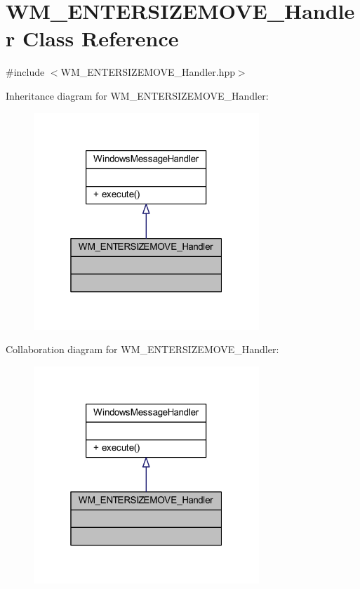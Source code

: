 \hypertarget{class_w_m___e_n_t_e_r_s_i_z_e_m_o_v_e___handler}{}\section{W\+M\+\_\+\+E\+N\+T\+E\+R\+S\+I\+Z\+E\+M\+O\+V\+E\+\_\+\+Handler Class Reference}
\label{class_w_m___e_n_t_e_r_s_i_z_e_m_o_v_e___handler}


{\ttfamily \#include $<$W\+M\+\_\+\+E\+N\+T\+E\+R\+S\+I\+Z\+E\+M\+O\+V\+E\+\_\+\+Handler.\+hpp$>$}



Inheritance diagram for W\+M\+\_\+\+E\+N\+T\+E\+R\+S\+I\+Z\+E\+M\+O\+V\+E\+\_\+\+Handler\+:\nopagebreak
\begin{figure}[H]
\begin{center}
\leavevmode
\includegraphics[width=241pt]{class_w_m___e_n_t_e_r_s_i_z_e_m_o_v_e___handler__inherit__graph}
\end{center}
\end{figure}


Collaboration diagram for W\+M\+\_\+\+E\+N\+T\+E\+R\+S\+I\+Z\+E\+M\+O\+V\+E\+\_\+\+Handler\+:\nopagebreak
\begin{figure}[H]
\begin{center}
\leavevmode
\includegraphics[width=241pt]{class_w_m___e_n_t_e_r_s_i_z_e_m_o_v_e___handler__coll__graph}
\end{center}
\end{figure}
